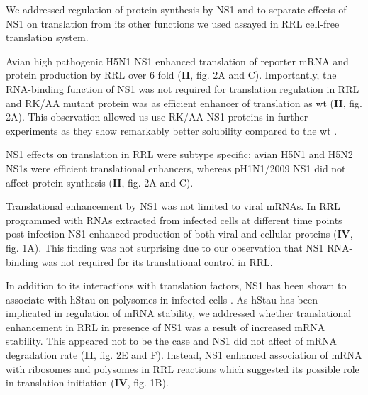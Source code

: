 		We addressed regulation of protein synthesis by NS1 and to separate effects of NS1 on translation from its other functions we used assayed in \gls{RRL} cell-free translation system. 
		
		Avian high pathogenic H5N1 NS1 enhanced translation of reporter mRNA and protein production by \gls{RRL} over 6 fold (\textbf{II}, fig. 2A and C). Importantly, the RNA-binding function of NS1 was not required for translation regulation in \gls{RRL} and RK/AA mutant protein was as efficient enhancer of translation as \gls{wt} (\textbf{II}, fig. 2A). This observation allowed us use RK/AA NS1 proteins in further experiments as they show remarkably better solubility compared to the \gls{wt} \parencite{Bornholdt2008}. 
		
		NS1 effects on translation in \gls{RRL} were subtype specific: avian H5N1 and H5N2 NS1s were efficient translational enhancers, whereas pH1N1/2009 NS1 did not affect protein synthesis (\textbf{II}, fig. 2A and C). 
		
		Translational enhancement by NS1 was not limited to viral mRNAs. In \gls{RRL} programmed with RNAs extracted from infected cells at different time points post infection NS1 enhanced production of both viral and cellular proteins (\textbf{IV}, fig. 1A). This finding was not surprising due to our observation that NS1 RNA-binding was not required for its translational control in \gls{RRL}. 
		
		In addition to its interactions with translation factors, NS1 has been shown to associate with \gls{hStau} on polysomes in infected cells \parencite{Falcon1999}. As \gls{hStau} has been implicated in regulation of mRNA stability, we addressed whether translational enhancement in RRL in presence of \gls{NS1} was a result of increased mRNA stability. This appeared not to be the case and NS1 did not affect of mRNA degradation rate (\textbf{II}, fig. 2E and F). Instead, NS1 enhanced association of mRNA with ribosomes and polysomes in RRL reactions which suggested its possible role in translation initiation (\textbf{IV}, fig. 1B).
		
